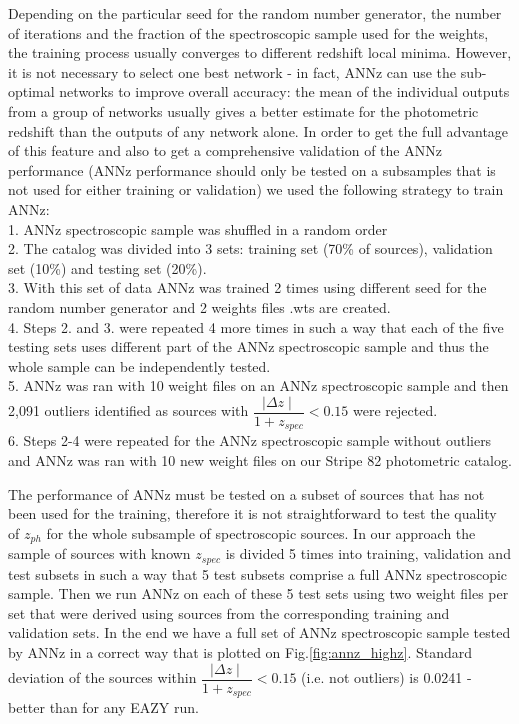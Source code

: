 \documentclass[apj,iop]{emulateapj}
\begin{document}
Depending on the particular seed for the random number generator, the number of iterations and the fraction of the spectroscopic sample used for the weights, the training process usually converges to different redshift local minima. However, it is not necessary to select one best network - in fact, ANNz can use the sub-optimal networks to improve overall accuracy: the mean of the individual outputs from a group of networks usually gives a better estimate for the photometric redshift than the outputs of any network alone. In order to get the full advantage of this feature and also to get a comprehensive validation of the ANNz performance (ANNz performance should only be tested on a subsamples that is not used for either training or validation) we used the following strategy to train ANNz:\\
1. ANNz spectroscopic sample was shuffled in a random order\\
2. The catalog was divided into 3 sets: training set (70\% of sources), validation set (10\%) and testing set (20\%).\\
3. With this set of data ANNz was trained 2 times using different seed for the random number generator and 2 weights files .wts are created.\\
4. Steps 2. and 3. were repeated 4 more times in such a way that each of the five testing sets uses different part of the ANNz spectroscopic sample and thus the whole sample can be independently tested.\\
5. ANNz was ran with 10 weight files on an ANNz spectroscopic sample and then 2,091 outliers identified as sources with $\dfrac{\mid\Delta z \mid }{1+z_{spec}}<0.15$ were rejected.\\
6. Steps 2-4 were repeated for the ANNz spectroscopic sample without outliers and ANNz was ran with 10 new weight files on our Stripe 82 photometric catalog. 

The performance of ANNz must be tested on a subset of sources that has not been used for the training, therefore it is not straightforward to test the quality of $z_{ph}$ for the whole subsample of spectroscopic sources. In our approach the sample of sources with known $z_{spec}$ is divided 5 times into training, validation and test subsets in such a way that 5 test subsets comprise a full ANNz spectroscopic sample. Then we run ANNz on each of these 5 test sets using two weight files per set that were derived using sources from the corresponding training and validation sets. In the end we have a full set of ANNz spectroscopic sample tested by ANNz in a correct way that is plotted on Fig.\ref{fig:annz_highz}. Standard deviation of the sources within $\dfrac{\mid\Delta z \mid }{1+z_{spec}}<0.15$ (i.e. not outliers) is 0.0241 - better than for any EAZY run. 
\end{document}
